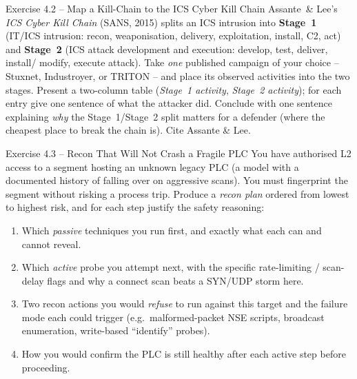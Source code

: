 \documentclass[11pt,a4paper]{article}
\begin{document}
\begin{taskbox}{Exercise 4.2 -- Map a Kill-Chain to the ICS Cyber Kill Chain}
Assante~\& Lee's \emph{ICS Cyber Kill Chain} (SANS, 2015) splits an ICS intrusion into
\textbf{Stage~1} (IT/ICS intrusion: recon, weaponisation, delivery, exploitation, install, C2,
act) and \textbf{Stage~2} (ICS attack development and execution: develop, test, deliver, install/
modify, execute attack). Take \emph{one} published campaign of your choice -- Stuxnet, Industroyer,
or TRITON -- and place its observed activities into the two stages. Present a two-column table
(\emph{Stage~1 activity}, \emph{Stage~2 activity}); for each entry give one sentence of what the
attacker did. Conclude with one sentence explaining \emph{why} the Stage~1/Stage~2 split matters
for a defender (where the cheapest place to break the chain is). Cite Assante \& Lee.
\end{taskbox}

\begin{taskbox}{Exercise 4.3 -- Recon That Will Not Crash a Fragile PLC}
You have authorised L2 access to a segment hosting an unknown legacy PLC (a model with a
documented history of falling over on aggressive scans). You must fingerprint the segment without
risking a process trip. Produce a \emph{recon plan} ordered from lowest to highest risk, and for
each step justify the safety reasoning:
\begin{enumerate}\setlength{\itemsep}{0pt}
  \item Which \emph{passive} techniques you run first, and exactly what each can and cannot reveal.
  \item Which \emph{active} probe you attempt next, with the specific rate-limiting / scan-delay
        flags and why a connect scan beats a SYN/UDP storm here.
  \item Two recon actions you would \emph{refuse} to run against this target and the failure mode
        each could trigger (e.g.\ malformed-packet NSE scripts, broadcast enumeration, write-based
        ``identify'' probes).
  \item How you would confirm the PLC is still healthy after each active step before proceeding.
\end{enumerate}
\end{taskbox}
\end{document}
